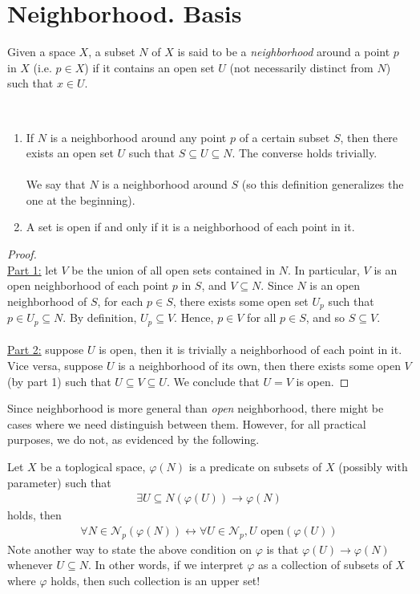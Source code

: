 \documentclass{treatise}
\begin{document}
\section{Neighborhood. Basis}
Given a space $X$, a subset $N$ of $X$ is said to be a \emph{neighborhood} around a point $p$ in $X$ (i.e. $p \in X$) if it contains an open set $U$ (not necessarily distinct from $N$) such that $x \in U$.
\begin{remark} \label{neighborhood-simple-facts} \ 
\begin{enumerate}
    \item If $N$ is a neighborhood around any point $p$ of a certain subset $S$, then there exists an open set $U$ such that $S \subseteq U \subseteq N$. The converse holds trivially.
    \\
    \\
    We say that $N$ is a neighborhood around $S$ (so this definition generalizes the one at the beginning).
    \item A set is open if and only if it is a neighborhood of each point in it.
\end{enumerate}
\end{remark}
\begin{proof} \ \\
\underline{Part 1:} let $V$ be the union of all open sets contained in $N$. In particular, $V$ is an open neighborhood of each point $p$ in $S$, and $V \subseteq N$. Since $N$ is an open neighborhood of $S$, for each $p \in S$, there exists some open set $U_p$ such that $p \in U_p \subseteq N$. By definition, $U_p \subseteq V$. Hence, $p \in V$ for all $p \in S$, and so $S \subseteq V$.
\\
\\
\underline{Part 2:} suppose $U$ is open, then it is trivially a neighborhood of each point in it. Vice versa, suppose $U$ is a neighborhood of its own, then there exists some open $V$ (by part 1) such that $U \subseteq V \subseteq U$. We conclude that $U = V$ is open.
\end{proof}
Since neighborhood is more general than \textit{open} neighborhood, there might be cases where we need distinguish between them. However, for all practical purposes, we do not, as evidenced by the following.
\begin{theorem}
Let $X$ be a toplogical space, $\varphi(N)$ is a predicate on subsets of $X$ (possibly with parameter) such that
\begin{align*}
    \exists U \subseteq N (\varphi(U)) \to \varphi(N)
\end{align*}
holds, then
\begin{align*}
    \forall N \in \mathcal{N}_p (\varphi(N)) \leftrightarrow \forall U \in \mathcal{N}_p, U \mbox{ open} (\varphi(U))
\end{align*}
Note another way to state the above condition on $\varphi$ is that $\varphi(U) \to \varphi(N)$ whenever $U \subseteq N$. In other words, if we interpret $\varphi$ as a collection of subsets of $X$ where $\varphi$ holds, then such collection is an upper set!
\end{theorem}
\end{document}
